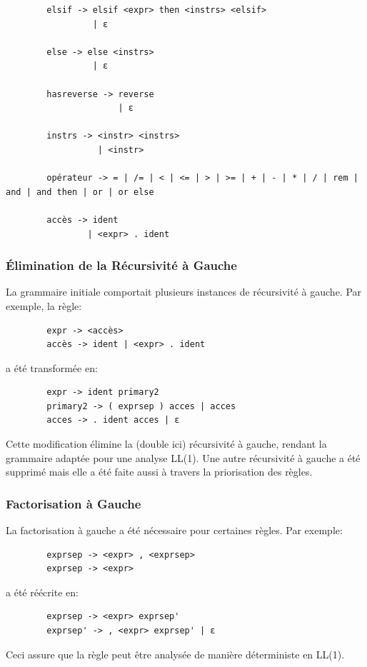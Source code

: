 \documentclass[french,a4paper]{article}
\begin{document}
\begin{verbatim}
        elsif -> elsif <expr> then <instrs> <elsif>
                 | ε

        else -> else <instrs>
                 | ε

        hasreverse -> reverse
                      | ε

        instrs -> <instr> <instrs>
                  | <instr>

        opérateur -> = | /= | < | <= | > | >= | + | - | * | / | rem | and | and then | or | or else

        accès -> ident
                | <expr> . ident

    \end{verbatim}

    \subsubsection{Élimination de la Récursivité à Gauche}
    La grammaire initiale comportait plusieurs instances de récursivité à gauche. Par exemple, la règle:
    \begin{verbatim}
        expr -> <accès>
        accès -> ident | <expr> . ident
    \end{verbatim}
    a été transformée en:
    \begin{verbatim}
        expr -> ident primary2
        primary2 -> ( exprsep ) acces | acces
        acces -> . ident acces | ε
    \end{verbatim}
    Cette modification élimine la (double ici) récursivité à gauche, rendant la grammaire adaptée pour une analyse LL(1).
    Une autre récursivité à gauche a été supprimé mais elle a été faite aussi à travers la priorisation des règles.

    \subsubsection{Factorisation à Gauche}
    La factorisation à gauche a été nécessaire pour certaines règles. Par exemple:
    \begin{verbatim}
        exprsep -> <expr> , <exprsep>
        exprsep -> <expr>
    \end{verbatim}
    a été réécrite en:
    \begin{verbatim}
        exprsep -> <expr> exprsep'
        exprsep' -> , <expr> exprsep' | ε
    \end{verbatim}
    Ceci assure que la règle peut être analysée de manière déterministe en LL(1).
\end{document}
